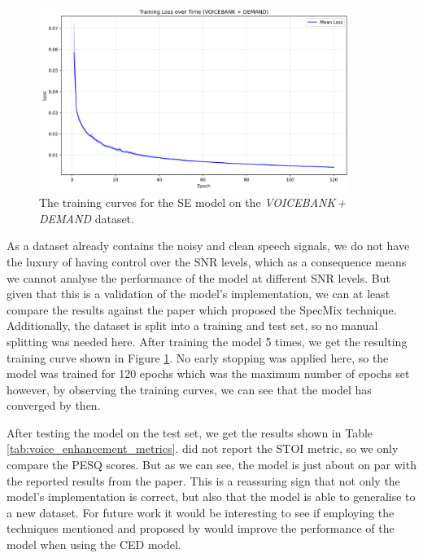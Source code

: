 \documentclass[logo,bsc,singlespacing,parskip,online]{infthesis}
\newcommand{\vbd}{\textit{VOICEBANK\,+\,DEMAND}\xspace}
\begin{document}
\begin{figure}[h]
   \centering
   \includegraphics[width=0.9\textwidth]{se-VOICEBANK-training-losses.png}
   \caption{The training curves for the SE model on the \vbd dataset.}
   \label{fig:se-voicebank-training-losses}
\end{figure}
As a dataset already contains the noisy and clean speech signals, we do not 
have the luxury of having control over the SNR levels, which as a 
consequence means we cannot analyse the performance of the model at different 
SNR levels. But given that this is a validation of the model's implementation, 
we can at least compare the results against the paper which proposed the SpecMix technique.
Additionally, the dataset is split into a training and test set, so no 
manual splitting was needed here. 
After training the model 5 times, we get the resulting training curve shown in Figure \ref{fig:se-voicebank-training-losses}.
No early stopping was applied here, so the model was trained for 120 epochs which was the maximum number of epochs set however,
by observing the training curves, we can see that the model has converged by then. 

After testing the model on the test set, we get the results shown in Table \ref{tab:voice_enhancement_metrics}.
\citet{kim_specmix_2021} did not report the STOI metric, so we only compare the PESQ scores.
But as we can see, the model is just about on par with the reported results from the paper.
This is a reassuring sign that not only the model's implementation is correct, but also
that the model is able to generalise to a new dataset. For future work it would 
be interesting to see if employing the techniques mentioned and proposed by \citet{kim_specmix_2021}
would improve the performance of the model when using the CED model. 
\end{document}

